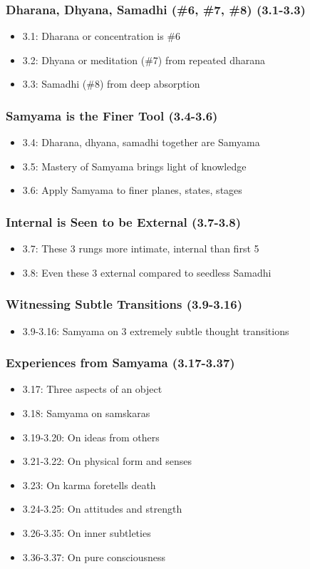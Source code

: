 \begin{frame}[fragile]\frametitle{Dharana, Dhyana, Samadhi (\#6, \#7, \#8) (3.1-3.3)}
\begin{itemize}
\item 3.1: Dharana or concentration is \#6
\item 3.2: Dhyana or meditation (\#7) from repeated dharana
\item 3.3: Samadhi (\#8) from deep absorption
\end{itemize}
\end{frame}

\begin{frame}[fragile]\frametitle{Samyama is the Finer Tool (3.4-3.6)}
\begin{itemize}
\item 3.4: Dharana, dhyana, samadhi together are Samyama
\item 3.5: Mastery of Samyama brings light of knowledge
\item 3.6: Apply Samyama to finer planes, states, stages
\end{itemize}
\end{frame}

\begin{frame}[fragile]\frametitle{Internal is Seen to be External (3.7-3.8)}
\begin{itemize}
\item 3.7: These 3 rungs more intimate, internal than first 5
\item 3.8: Even these 3 external compared to seedless Samadhi
\end{itemize}
\end{frame}

\begin{frame}[fragile]\frametitle{Witnessing Subtle Transitions (3.9-3.16)}
\begin{itemize}
\item 3.9-3.16: Samyama on 3 extremely subtle thought transitions
\end{itemize}
\end{frame}

\begin{frame}[fragile]\frametitle{Experiences from Samyama (3.17-3.37)}
\begin{itemize}
\item 3.17: Three aspects of an object
\item 3.18: Samyama on samskaras
\item 3.19-3.20: On ideas from others
\item 3.21-3.22: On physical form and senses
\item 3.23: On karma foretells death
\item 3.24-3.25: On attitudes and strength
\item 3.26-3.35: On inner subtleties
\item 3.36-3.37: On pure consciousness
\end{itemize}
\end{frame}

